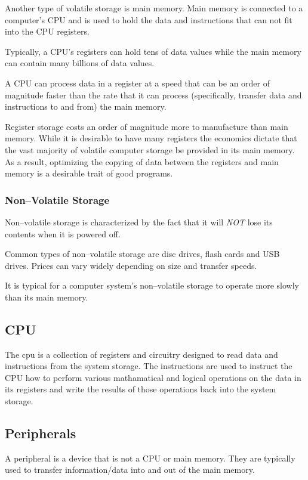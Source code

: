 Another type of volatile storage is main memory.
Main memory is connected to a computer's CPU and is used to hold
the data and instructions that can not fit into the CPU registers.

Typically, a CPU's registers can hold tens of data values while
the main memory can contain many billions of data values.

A CPU can process data in a register at a speed that can be an order 
of magnitude faster than the rate that it can process (specifically,
transfer data and instructions to and from) the main memory.  

Register storage costs an order of magnitude more to manufacture than
main memory.  While it is desirable to have many registers the economics 
dictate that the vast majority of volatile computer storage be provided
in its main memory.  As a result, optimizing the copying of data between 
the registers and main memory is a desirable trait of good programs.

\subsubsection{Non--Volatile Storage}

Non--volatile storage is characterized by the fact that it will {\em NOT} 
lose its contents when it is powered off.

Common types of non--volatile storage are disc drives, flash cards and USB 
drives.  Prices can vary widely depending on size and transfer speeds.

It is typical for a computer system's non--volatile storage to operate
more slowly than its main memory.

\subsection{CPU}

The \acrshort{cpu} is a collection of registers and circuitry designed
to read data and instructions from the system storage.  The instructions
are used to instruct the CPU how to perform various mathamatical and 
logical operations on the data in its registers and write the results
of those operations back into the system storage.

\subsection{Peripherals}

A peripheral is a device that is not a CPU or main memory.  They are 
typically used to transfer information/data into and out of the 
main memory.

